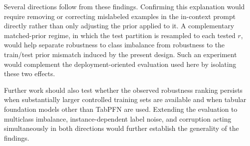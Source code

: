Several directions follow from these findings. Confirming this explanation
would require removing or correcting mislabeled examples in the in-context
prompt directly rather than only adjusting the prior applied to it. A
complementary matched-prior regime, in which the test partition is resampled to
each tested $r$, would help separate robustness to class imbalance from
robustness to the train/test prior mismatch induced by the present design. Such
an experiment would complement the deployment-oriented evaluation used here by
isolating these two effects.

Further work should also test whether the observed robustness ranking persists
when substantially larger controlled training sets are available and when
tabular foundation models other than TabPFN are used. Extending the evaluation
to multiclass imbalance, instance-dependent label noise, and corruption acting
simultaneously in both directions would further establish the generality of the
findings.
